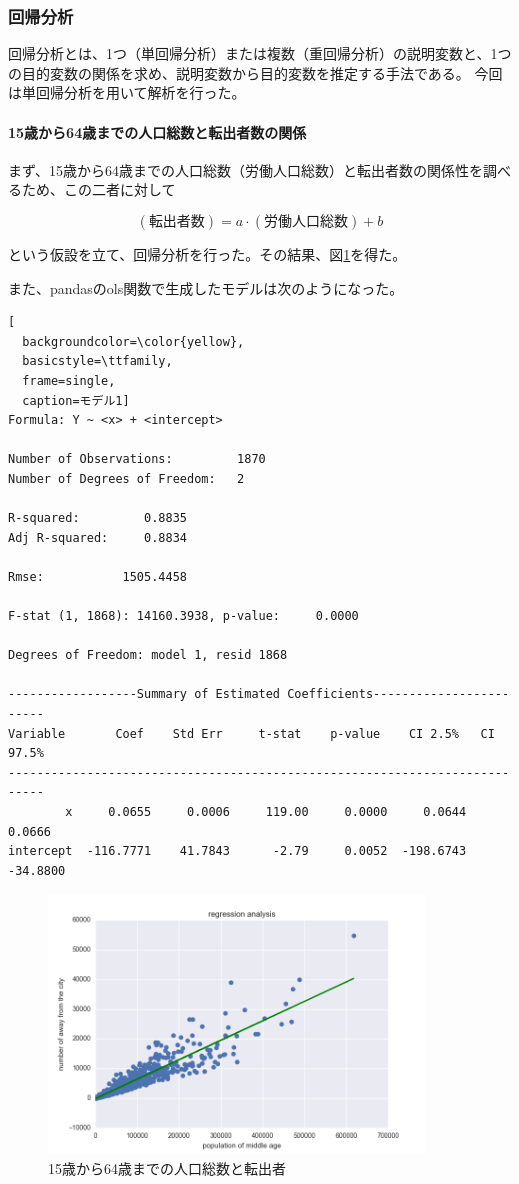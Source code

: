 \documentclass[a4paper,xelatex,ja=standard,jafont=hiragino-pron, 10pt]{bxjsarticle}
\begin{document}
\subsubsection{回帰分析}

回帰分析とは、1つ（単回帰分析）または複数（重回帰分析）の説明変数と、1つの目的変数の関係を求め、説明変数から目的変数を推定する手法である。
今回は単回帰分析を用いて解析を行った。

\paragraph{15歳から64歳までの人口総数と転出者数の関係}

まず、15歳から64歳までの人口総数（労働人口総数）と転出者数の関係性を調べるため、この二者に対して

\begin{equation}
  (\mbox{転出者数}) = a \cdot (\mbox{労働人口総数}) + b
\end{equation}

という仮設を立て、回帰分析を行った。その結果、図\ref{reg_ma}を得た。

また、pandasのols関数で生成したモデルは次のようになった。

\begin{lstlisting}[
  backgroundcolor=\color{yellow},
  basicstyle=\ttfamily,
  frame=single,
  caption=モデル1]
Formula: Y ~ <x> + <intercept>

Number of Observations:         1870
Number of Degrees of Freedom:   2

R-squared:         0.8835
Adj R-squared:     0.8834

Rmse:           1505.4458

F-stat (1, 1868): 14160.3938, p-value:     0.0000

Degrees of Freedom: model 1, resid 1868

------------------Summary of Estimated Coefficients------------------------
Variable       Coef    Std Err     t-stat    p-value    CI 2.5%   CI 97.5%
---------------------------------------------------------------------------
        x     0.0655     0.0006     119.00     0.0000     0.0644     0.0666
intercept  -116.7771    41.7843      -2.79     0.0052  -198.6743   -34.8800
\end{lstlisting}

\begin{figure}[ht]
  \centering
  \includegraphics[clip, width=10.0cm]{../data/picture/regression_ma.png}
  \caption{15歳から64歳までの人口総数と転出者}
  \label{reg_ma}
\end{figure}
\end{document}
